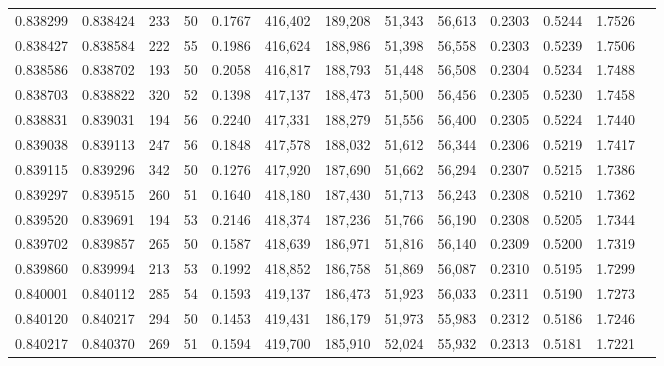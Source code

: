 \begin{tabular}{rrrrrrrrrrrrr}
0.838299 & 0.838424 &   233 &  50 &                                     0.1767 & 416,402 & 189,208 &  51,343 &  56,613 & 0.2303 & 0.5244 & 1.7526 \\
0.838427 & 0.838584 &   222 &  55 &                                     0.1986 & 416,624 & 188,986 &  51,398 &  56,558 & 0.2303 & 0.5239 & 1.7506 \\
0.838586 & 0.838702 &   193 &  50 &                                     0.2058 & 416,817 & 188,793 &  51,448 &  56,508 & 0.2304 & 0.5234 & 1.7488 \\
0.838703 & 0.838822 &   320 &  52 &                                     0.1398 & 417,137 & 188,473 &  51,500 &  56,456 & 0.2305 & 0.5230 & 1.7458 \\
0.838831 & 0.839031 &   194 &  56 &                                     0.2240 & 417,331 & 188,279 &  51,556 &  56,400 & 0.2305 & 0.5224 & 1.7440 \\
0.839038 & 0.839113 &   247 &  56 &                                     0.1848 & 417,578 & 188,032 &  51,612 &  56,344 & 0.2306 & 0.5219 & 1.7417 \\
0.839115 & 0.839296 &   342 &  50 &                                     0.1276 & 417,920 & 187,690 &  51,662 &  56,294 & 0.2307 & 0.5215 & 1.7386 \\
0.839297 & 0.839515 &   260 &  51 &                                     0.1640 & 418,180 & 187,430 &  51,713 &  56,243 & 0.2308 & 0.5210 & 1.7362 \\
0.839520 & 0.839691 &   194 &  53 &                                     0.2146 & 418,374 & 187,236 &  51,766 &  56,190 & 0.2308 & 0.5205 & 1.7344 \\
0.839702 & 0.839857 &   265 &  50 &                                     0.1587 & 418,639 & 186,971 &  51,816 &  56,140 & 0.2309 & 0.5200 & 1.7319 \\
0.839860 & 0.839994 &   213 &  53 &                                     0.1992 & 418,852 & 186,758 &  51,869 &  56,087 & 0.2310 & 0.5195 & 1.7299 \\
0.840001 & 0.840112 &   285 &  54 &                                     0.1593 & 419,137 & 186,473 &  51,923 &  56,033 & 0.2311 & 0.5190 & 1.7273 \\
0.840120 & 0.840217 &   294 &  50 &                                     0.1453 & 419,431 & 186,179 &  51,973 &  55,983 & 0.2312 & 0.5186 & 1.7246 \\
0.840217 & 0.840370 &   269 &  51 &                                     0.1594 & 419,700 & 185,910 &  52,024 &  55,932 & 0.2313 & 0.5181 & 1.7221 \\

\end{tabular}
